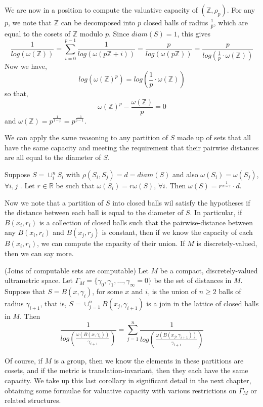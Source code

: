 \begin{example}
We are now in a position to compute the valuative capacity of $(\mathbb{Z}, \rho_p)$. For any $p$, we note that $\mathbb{Z}$ can be decomposed into $p$ closed balls of radius $\frac{1}{p}$, which are equal to the cosets of $\mathbb{Z}$ modulo $p$. Since $diam(S)=1$, this gives 
\[\frac{1}{log(\omega(\mathbb{Z}))} = \sum_{i=0}^{p-1} \frac{1}{log(\omega(p\mathbb{Z} +i))} = \frac{p}{log(\omega(p\mathbb{Z}))} = \frac{p}{log(\frac{1}{p} \cdot \omega(\mathbb{Z}))}\]
Now we have,
\[log(\omega(\mathbb{Z})^p) = log(\frac{1}{p} \cdot\omega(\mathbb{Z}))\]
so that,
\[\omega(\mathbb{Z})^p - \frac{\omega(\mathbb{Z})}{p} = 0 \]
and $\omega(\mathbb{Z})= p^{\frac{1}{1-p}}=p^{\frac{-1}{p-1}}$.
\end{example}

We can apply the same reasoning to any partition of $S$ made up of sets that all have the same capacity and meeting the requirement that their pairwise distances are all equal to the diameter of $S$.\\

\begin{corollary}
	Suppose $S = \cup_i^n S_i$ with $\rho(S_i, S_j)=d=diam(S)$ and also $\omega(S_i)=\omega(S_j)$, $\forall i,j$ .  Let $r \in \mathbb{R}$ be such that $\omega(S_i)=r\omega(S)$, $\forall i$. Then $\omega(S) = r^{\frac{1}{n-1}}\cdot d$. 
\end{corollary}

Now we note that a partition of $S$ into closed balls wil satisfy the hypotheses if the distance between each ball is equal to the diameter of $S$. In particular, if $B(x_i,r_i)$ is a collection of closed balls such that the pairwise-distance between any $B(x_i,r_i)$ and $B(x_j,r_j)$ is constant, then if we know the capacity of each $B(x_i,r_i)$, we can compute the capacity of their union. If $M$ is discretely-valued, then we can say more. 
\begin{corollary}
	(Joins of computable sets are computable) Let $M$ be a compact, discretely-valued ultrametric space. Let $\Gamma_M = \{\gamma_0, \gamma_1,\ldots, \gamma_\infty=0\}$ be the set of distances in $M$. Suppose that $S = B(x, \gamma_i)$,  for some $x$ and $i$, is the union of $n \geq 2$ balls of radius $\gamma_{i+1}$, that is, $S=\cup_{j=1}^n B(x_j, \gamma_{i+1})$ is a join in the lattice of closed balls in $M$. Then 
	\[\frac{1}{log(\frac{\omega(B(x, \gamma_i))}{\gamma_{i+1}} )} = \sum_{j=1}^n \frac{1}{log(\frac{\omega(B(x_j, \gamma_{i+1}))}{\gamma_{i+1} })}\]
\end{corollary}

Of course, if $M$ is a group, then we know the elements in these partitions are cosets, and if the metric is translation-invariant, then they each have the same capacity. We take up this last corollary in significant detail in the next chapter, obtaining some formulae for valuative capacity with various restrictions on $\Gamma_M$ or related structures.